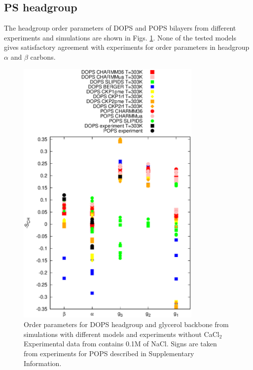 \documentclass[aps,prl,superscriptaddress,twocolumn]{revtex4}
\begin{document}
\subsection{PS headgroup}
The headgroup order parameters of DOPS and POPS bilayers 
from different experiments and simulations are shown in
Figs. \ref{HGorderParametersPS}.
None of the tested models gives satisfactory agreement with
experiments for order parameters in headgroup $\alpha$ and $\beta$
carbons.
\begin{figure}[]
  \centering
  \includegraphics[width=9.0cm]{../Figs/HGorderparametersPS.eps}
  \caption{\label{HGorderParametersPS}
    Order parameters for DOPS headgroup and glycerol
    backbone from simulations with different models and experiments without CaCl$_2$ 
    Experimental data from \cite{browning80} contains 0.1M of NaCl.
    Signs are taken from experiments for POPS described in Supplementary Information.
  }
\end{figure}
\end{document}
